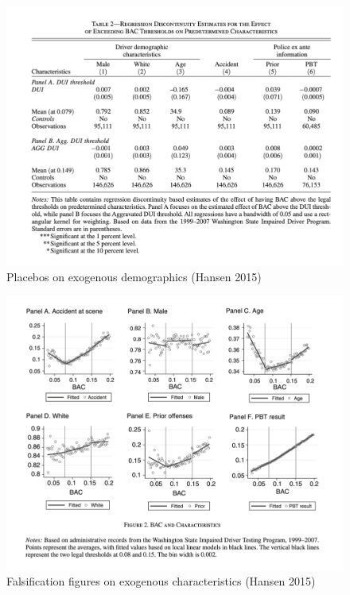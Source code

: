 \documentclass{beamer}
\begin{document}
\begin{frame}

	\begin{figure}
	\includegraphics[scale=0.35]{./lecture_includes/hansen_table1}
	\caption{Placebos on exogenous demographics (Hansen 2015)}
	\end{figure}
\end{frame}


\begin{frame}

	\begin{figure}
	\includegraphics[scale=0.35]{./lecture_includes/hansen_fig3}
	\caption{Falsification figures on exogenous characteristics (Hansen 2015)}
	\end{figure}
\end{frame}
\end{document}
